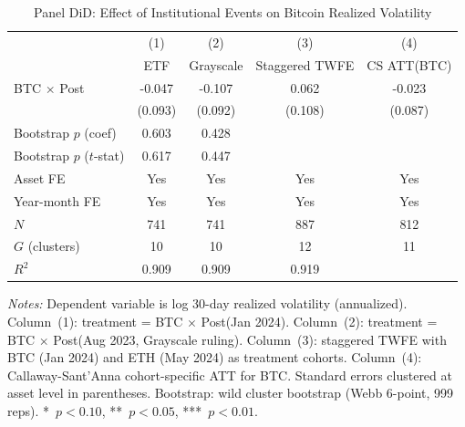 \begin{table}[htbp]
  \centering
  \caption{Panel DiD: Effect of Institutional Events on Bitcoin Realized Volatility}\label{tab:main-did}
  \begin{threeparttable}
    \begin{tabular}{l S[table-format=-1.3] S[table-format=-1.3] S[table-format=-1.3] S[table-format=-1.3]}
      \toprule
      & {(1)} & {(2)} & {(3)} & {(4)} \\
      & {ETF} & {Grayscale} & {Staggered TWFE} & {CS ATT(BTC)} \\
      \midrule
      BTC $\times$ Post & -0.047 & -0.107 & 0.062 & -0.023 \\
      & {(0.093)} & {(0.092)} & {(0.108)} & {(0.087)} \\[4pt]
      Bootstrap $p$ (coef) & 0.603 & 0.428 & & \\
      Bootstrap $p$ ($t$-stat) & 0.617 & 0.447 & & \\
      \midrule
      Asset FE & {Yes} & {Yes} & {Yes} & {Yes} \\
      Year-month FE & {Yes} & {Yes} & {Yes} & {Yes} \\
      $N$ & {741} & {741} & {887} & {812} \\
      $G$ (clusters) & {10} & {10} & {12} & {11} \\
      $R^2$ & 0.909 & 0.909 & 0.919 & \\
      \bottomrule
    \end{tabular}
    \begin{tablenotes}[flushleft]
      \small
      \item \textit{Notes:} Dependent variable is log 30-day realized volatility (annualized).
        Column~(1): treatment = BTC $\times$ Post(Jan 2024). Column~(2): treatment = BTC $\times$ Post(Aug 2023, Grayscale ruling).
        Column~(3): staggered TWFE with BTC (Jan 2024) and ETH (May 2024) as treatment cohorts.
        Column~(4): Callaway-Sant'Anna cohort-specific ATT for BTC.
        Standard errors clustered at asset level in parentheses.
        Bootstrap: wild cluster bootstrap (Webb 6-point, 999 reps).
        {*}~$p<0.10$, {**}~$p<0.05$, {***}~$p<0.01$.
    \end{tablenotes}
  \end{threeparttable}
\end{table}
